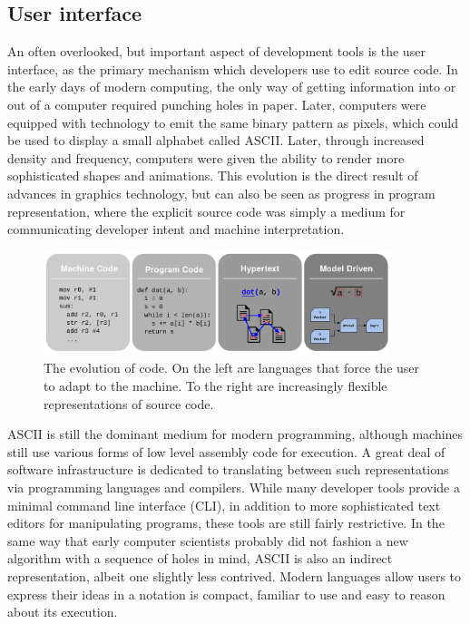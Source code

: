 \documentclass[12pt,initial,twoside,maitrise]{dms}
\numberwithin{equation}{section}
\numberwithin{table}{chapter}
\numberwithin{figure}{chapter}
\begin{document}
\subsection{User interface}

An often overlooked, but important aspect of development tools is the user interface, as the primary mechanism which developers use to edit source code. In the early days of modern computing, the only way of getting information into or out of a computer required punching holes in paper. Later, computers were equipped with technology to emit the same binary pattern as pixels, which could be used to display a small alphabet called ASCII. Later, through increased density and frequency, computers were given the ability to render more sophisticated shapes and animations. This evolution is the direct result of advances in graphics technology, but can also be seen as progress in program representation, where the explicit source code was simply a medium for communicating developer intent and machine interpretation.

\begin{figure}
    \centering
    \includegraphics[width=0.90\textwidth]{progress_in_program.png}
    \caption{The evolution of code. On the left are languages that force the user to adapt to the machine. To the right are increasingly flexible representations of source code.}
    \label{fig:evolution_of_programming}
\end{figure}

ASCII is still the dominant medium for modern programming, although machines still use various forms of low level assembly code for execution. A great deal of software infrastructure is dedicated to translating between such representations via programming languages and compilers. While many developer tools provide a minimal command line interface (CLI), in addition to more sophisticated text editors for manipulating programs, these tools are still fairly restrictive. In the same way that early computer scientists probably did not fashion a new algorithm with a sequence of holes in mind, ASCII is also an indirect representation, albeit one slightly less contrived. Modern languages allow users to express their ideas in a notation is compact, familiar to use and easy to reason about its execution.
\end{document}
